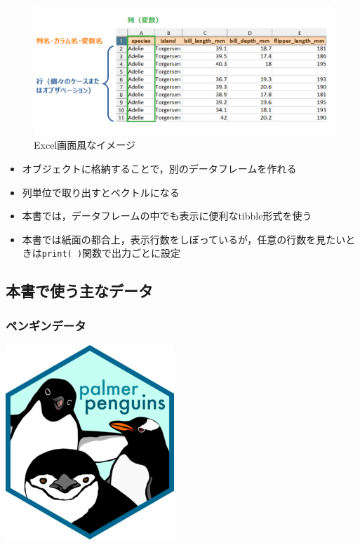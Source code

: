 \documentclass[
  xelatex,ja=standard, b5paper]{bxjsbook}
\providecommand{\tightlist}{%
  \setlength{\itemsep}{0pt}\setlength{\parskip}{0pt}}
\begin{document}
\begin{figure}

{\centering \includegraphics[width=0.6\linewidth]{images/df_xl} 

}

\caption{Excel画面風なイメージ}\label{fig:dfxl}
\end{figure}

\begin{itemize}
\tightlist
\item
  オブジェクトに格納することで，別のデータフレームを作れる
\item
  列単位で取り出すとベクトルになる
\item
  本書では，データフレームの中でも表示に便利なtibble形式を使う
\item
  本書では紙面の都合上，表示行数をしぼっているが，任意の行数を見たいときは\texttt{print(\ )}関数で出力ごとに設定
\end{itemize}

\hypertarget{p-df-main}{%
\subsection{本書で使う主なデータ}\label{p-df-main}}

\hypertarget{p-df-main-p}{%
\subsubsection{ペンギンデータ}\label{p-df-main-p}}

\includegraphics{images/penguins_logo.png}
\end{document}
